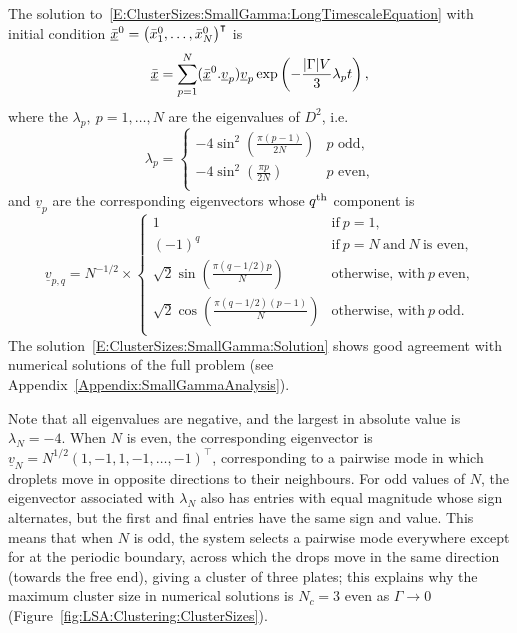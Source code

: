 The solution to~\eqref{E:ClusterSizes:SmallGamma:LongTimescaleEquation} with initial condition $\underline{\bar{x}}^0 = \left(\bar{x}_1^0,\dots, \bar{x}_N^0\right)^\intercal$  is
\begin{equation}\label{E:ClusterSizes:SmallGamma:Solution}
\underline{\bar{x}} = \sum_{p=1}^{N} (\underline{\bar{x}}^0.\underline{v}_p)\underline{v}_p\exp\left(-\frac{|\Gamma|V}{3}\lambda_p t\right),
\end{equation}
where the $\lambda_p,~ p = 1,\dots, N$ are the eigenvalues of $D^2$, i.e.
\begin{equation}\label{E:ClusterSizes:SmallGamma:Eigenvalues}
\lambda_p =\left\{
 \begin{array}{ll}
-4\sin^2\left(\frac{\pi(p-1)}{2N}\right) & p \text{~odd,}\\
-4\sin^2\left(\frac{\pi p}{2N} \right) & p\text{~even,}\\
 \end{array}\right.
\end{equation}
and $\underline{v}_p$ are the corresponding eigenvectors whose $q^{\text{th}}$ component is
\begin{equation}\label{E:ClusterSizes:SmallGamma:Eigenvectors}
\underline{v}_{p,q} =N^{-1/2} \times\left\{
 \begin{array}{ll}
1&  \text{if}~p = 1,\\
 (-1)^q   & \text{if}~p = N ~ \text{and} ~ N ~\text{is even,}\\
\sqrt{2}\sin \left(\frac{\pi(q-1/2)p}{N}\right) & \text{otherwise, with}~p ~ \text{even,} \\
  \sqrt{2}\cos \left(\frac{\pi(q-1/2)(p-1)}{N}\right) & \text{otherwise, with}~p ~ \text{odd.} \\
  \end{array}\right.
\end{equation}
The solution~\eqref{E:ClusterSizes:SmallGamma:Solution} shows good agreement with numerical solutions of the full problem (see Appendix~\ref{Appendix:SmallGammaAnalysis}).

Note that all eigenvalues are negative, and the largest in absolute value is $\lambda_N =-4$. When $N$ is even, the corresponding eigenvector is $\underline{v}_N = N^{1/2}\left(1,-1,1,-1,\dots,-1\right)^\intercal$, corresponding to a pairwise mode in which droplets move in opposite directions to their neighbours. For odd values of $N$, the eigenvector associated with $\lambda_N$ also has entries with equal magnitude whose sign alternates, but the first and final entries have the same sign and value. This means that when $N$ is odd, the system selects a pairwise mode everywhere except for at the periodic boundary, across which the drops move in the same direction (towards the free end), giving a cluster of three plates; this explains why the maximum cluster size in numerical solutions is $N_c = 3$ even as $\Gamma \to 0$ (Figure~\ref{fig:LSA:Clustering:ClusterSizes}).

